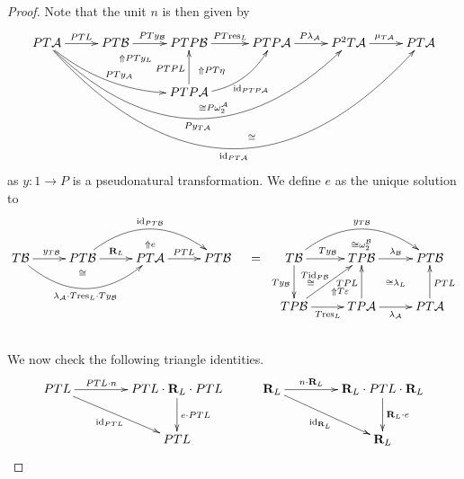 \documentclass[a4paper,oneside,english]{amsart}
\numberwithin{equation}{section}
\numberwithin{figure}{section}
\theoremstyle{plain}
\theoremstyle{definition}
\theoremstyle{remark}
\theoremstyle{definition}
\theoremstyle{plain}
\theoremstyle{plain}
\theoremstyle{plain}
\begin{document}
\begin{proof}
Note that the unit $n$ is then given by 
\[
\xymatrix@=1em{PT\mathcal{A}\ar[rr]^{PTL}\ar@/_{1pc}/[rrrrdd]^{PTy_{\mathcal{A}}}\ar@/_{5pc}/[rrrrrrrr]_{Py_{T\mathcal{A}}}\ar@/_{7pc}/[rrrrrrrrrr]_{\textnormal{id}_{PT\mathcal{A}}} &  & PT\mathcal{B}\ar[rr]^{PTy_{\mathcal{B}}} &  & PTP\mathcal{B}\ar[rr]^{PT\textnormal{res}_{L}}\ar@{}[rdd]|-{\Uparrow PT\eta} &  & PTP\mathcal{A}\ar[rr]^{P\lambda_{\mathcal{A}}} &  & P^{2}T\mathcal{A}\ar[rr]^{\mu_{T\mathcal{A}}} &  & PT\mathcal{A}\\
 &  &  & \ar@{}[ul]|-{\Uparrow PTy_{L}}\\
 &  &  &  & PTP\mathcal{A}\ar[uu]^{PTPL}\ar@/_{1pc}/[rruu]_{\textnormal{id}_{PTP\mathcal{A}}} & \;\\
 &  &  &  &  & \;\ar@{}[ul]|-{\cong P\omega_{2}^{\mathcal{A}}}\\
 &  &  &  &  & \; & \ar@{}[l]|-{\cong}
}
\]
as $y\colon1\to P$ is a pseudonatural transformation. We define $e$
as the unique solution to
\[
\xymatrix@=1em{ &  &  &  & \;\ar@{}[d]|-{\Uparrow e} &  &  &  &  &  & \ar@{}[d]|-{\cong\omega_{2}^{\mathcal{B}}}\\
T\mathcal{B}\ar[rr]^{y_{T\mathcal{B}}}\ar@/_{2pc}/[rrrr]_{\lambda_{\mathcal{A}}\cdot T\textnormal{res}_{L}\cdot Ty_{\mathcal{B}}} &  & PT\mathcal{B}\ar[rr]^{\mathbf{R}_{L}}\ar@/^{2pc}/[rrrr]^{\textnormal{id}_{PT\mathcal{B}}} &  & PT\mathcal{A}\ar[rr]^{PTL} &  & PT\mathcal{B} & = & T\mathcal{B}\ar@/_{0pc}/[dd]_{Ty_{\mathcal{B}}}\ar@/^{0pc}/[rr]^{Ty_{\mathcal{B}}}\ar@/^{2pc}/[rrrr]^{y_{T\mathcal{B}}} &  & TP\mathcal{B}\ar[rr]^{\lambda_{\mathcal{B}}} &  & PT\mathcal{B}\\
 &  & \;\ar@{}[u]|-{\cong} &  &  &  &  &  & \ar@{}[r]|-{\cong} & \ar@{}[rd]|-{\Uparrow T{\varepsilon}} &  & \ar@{}[]|-{\cong\lambda_{L}}\\
 &  &  &  &  &  &  &  & TP\mathcal{B}\ar[rruu]^{T\textnormal{id}_{P\mathcal{B}}}\ar@/_{0pc}/[rr]_{T\textnormal{res}_{L}} &  & TP\mathcal{A}\ar[uu]^{TPL}\ar[rr]_{\lambda_{\mathcal{A}}} &  & PT\mathcal{A}\ar[uu]_{PTL}\\
\\
}
\]

We now check the following triangle identities.
\[
\xymatrix@=1em{PTL\ar[ddrrr]_{\textnormal{id}_{PTL}}{\ar^-{{PTL\cdot n}}[{rrr}]} &  &  & PTL\cdot\mathbf{R}_{L}\cdot PTL\ar[dd]^{e\cdot PTL} &  & \mathbf{R}_{L}\ar[ddrrr]_{\textnormal{id}_{\mathbf{R}_{L}}}{\ar^-{{n\cdot\mathbf{R}_{L}}}[{rrr}]} &  &  & \mathbf{R}_{L}\cdot PTL\cdot\mathbf{R}_{L}\ar[dd]^{\mathbf{R}_{L}\cdot e}\\
\\
 &  &  & PTL &  &  &  &  & \mathbf{R}_{L}
}
\]


\end{proof}
\end{document}
